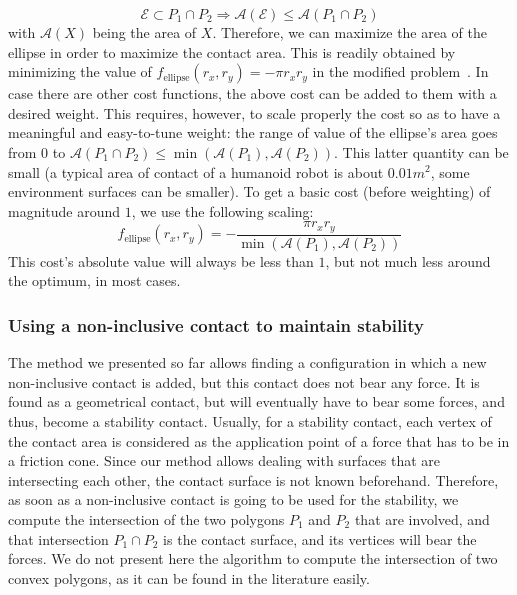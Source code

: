 \begin{equation}
\mathcal{E} \subset P_1 \cap P_2 \Longrightarrow  \mathcal{A}(\mathcal{E}) \le \mathcal{A}(P_1 \cap P_2)
\end{equation}
with $\mathcal{A}(X)$ being the area of $X$.\newline
Therefore, we can maximize the area of the ellipse in order to maximize the contact area.
This is readily obtained by minimizing the value of $f_{\text{ellipse}}(r_x, r_y) = -\pi r_x r_y$ in the modified problem~.
In case there are other cost functions, the above cost can be added to them with a desired weight.
This requires, however, to scale properly the cost so as to have a meaningful and easy-to-tune weight: the range of value of the ellipse's area goes from $0$ to $\mathcal{A}(P_1 \cap P_2) \leq \min (\mathcal{A}(P_1), \mathcal{A}(P_2))$.
This latter quantity can be small (a typical area of contact of a humanoid robot is about $0.01m^2$, some environment surfaces can be smaller).
To get a basic cost (before weighting) of magnitude around $1$, we use the following scaling:
\begin{equation}
f_\text{ellipse}(r_x, r_y) = - \frac{\pi r_x r_y}{\min (\mathcal{A}(P_1), \mathcal{A}(P_2))}
\label{eq:cost-ellipse}
\end{equation}
This cost's absolute value will always be less than $1$, but not much less around the optimum, in most cases.


\subsubsection{Using a non-inclusive contact to maintain stability}
\label{subsubsec:stability}


The method we presented so far allows finding a configuration in which a new non-inclusive contact is added, but this contact does not bear any force.
It is found as a geometrical contact, but will eventually have to bear some forces, and thus, become a stability contact.
Usually, for a stability contact, each vertex of the contact area is considered as the application point of a force that has to be in a friction cone.
Since our method allows dealing with surfaces that are intersecting each other, the contact surface is not known beforehand.
Therefore, as soon as a non-inclusive contact is going to be used for the stability, we compute the intersection of the two polygons $P_1$ and $P_2$ that are involved, and that intersection $P_1 \cap P_2$ is the contact surface, and its vertices will bear the forces.
We do not present here the algorithm to compute the intersection of two convex polygons, as it can be found in the literature easily.


